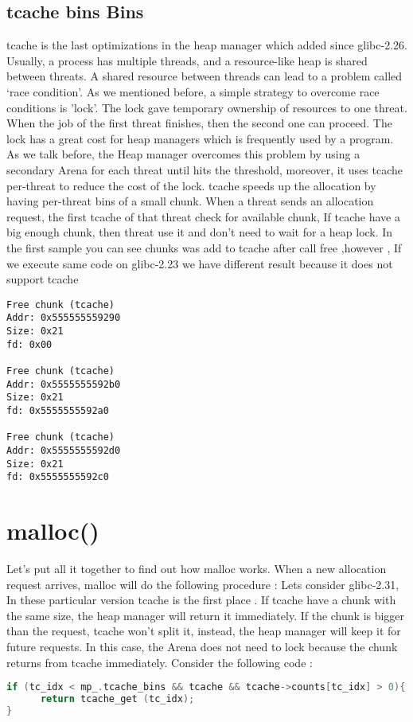 \documentclass{masterthesis}
\newcommand*\libc{glibc}
\newcommand*\tch{tcache}
\begin{document}
\subsection{\tch{} bins Bins}
\tch{} is the last optimizations in the heap manager which added since \libc{-2.26}. Usually, a process has multiple threads, and a resource-like heap is shared between threats. A shared resource between threads can lead to a problem called ‘race condition’. As we mentioned before, a simple strategy to overcome race conditions is 'lock'. The lock gave temporary ownership of resources to one threat. When the job of the first threat finishes, then the second one can proceed. The lock has a great cost for heap managers which is frequently used by a program. As we talk before, the Heap manager overcomes this problem by using a secondary Arena for each threat until hits the threshold, moreover, it uses \tch{} per-threat to reduce the cost of the lock. \tch{} speeds up the allocation by having per-threat bins of a small chunk. When a threat sends an allocation request, the first \tch{} of that threat check for available chunk, If \tch{} have a big enough chunk, then threat use it and don’t need to wait for a heap lock. In the first sample you can see chunks was add to \tch{} after call free ,however , If we execute same code on \libc{-2.23} we have different result because it does not support \tch{}

\begin{lstlisting}
Free chunk (tcache) 
Addr: 0x555555559290
Size: 0x21
fd: 0x00

Free chunk (tcache) 
Addr: 0x5555555592b0
Size: 0x21
fd: 0x5555555592a0

Free chunk (tcache) 
Addr: 0x5555555592d0
Size: 0x21
fd: 0x5555555592c0
\end{lstlisting}

\section{malloc()}
Let's put all it together to find out how malloc works. When a new allocation request arrives, malloc will do the following procedure :
Lets consider \libc{-2.31}, In these particular version \tch{} is the first place . If \tch{} have a chunk with the same size, the heap manager will return it immediately. If the chunk is bigger than the request, \tch{} won't split it, instead, the heap manager will keep it for future requests. In this case, the Arena does not need to lock because the chunk returns from \tch{} immediately. Consider the following code :
\begin{lstlisting}[language=c]
 if (tc_idx < mp_.tcache_bins && tcache && tcache->counts[tc_idx] > 0){
      return tcache_get (tc_idx);
}
\end{lstlisting}
\end{document}
